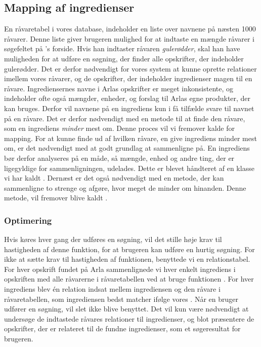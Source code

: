 \subsection{Mapping af ingredienser}
\label{sec:mapping}
En råvaretabel i vores database, indeholder en liste over navnene på næsten 1000 råvarer. Denne liste giver brugeren mulighed for at indtaste en mængde råvarer i søgefeltet på {\Foodl}'s forside. Hvis han indtaster råvaren \textit{gulerødder}, skal han have muligheden for at udføre en søgning, der finder alle opskrifter, der indeholder gulerødder. Det er derfor nødvendigt for vores system at kunne oprette relationer imellem vores råvarer, og de opskrifter, der indeholder ingredienser magen til en råvare. Ingrediensernes navne i Arlas opskrifter er meget inkonsistente, og indeholder ofte også mængder, enheder, og forslag til Arlas egne produkter, der kan bruges. Derfor vil navnene på en ingrediens kun i få tilfælde svare til navnet på en råvare. Det er derfor nødvendigt med en metode til at finde den råvare, som en ingrediens \textit{minder} mest om. Denne proces vil vi fremover kalde for mapping. For at kunne finde ud af hvilken råvare, en give ingrediens minder mest om, er det nødvendigt med at godt grundlag at sammenligne på. En ingrediens bør derfor analyseres på en måde, så mængde, enhed og andre ting, der er ligegyldige for sammenligningen, udelades. Dette er blevet håndteret af en klasse vi har kaldt . Dernæst er det også nødvendigt med en metode, der kan sammenligne to strenge og afgøre, hvor meget de minder om hinanden. Denne metode, vil fremover blive kaldt .

\subsubsection{Optimering}
Hvis  køres hver gang der udføres en søgning, vil det stille høje krav til hastigheden af denne funktion, for at brugeren kan udføre en hurtig søgning. For ikke at sætte krav til hastigheden af funktionen, benyttede vi en relationstabel. For hver opskrift fundet på Arla sammenlignede vi hver enkelt ingrediens i opskriften med alle råvarerne i råvaretabellen ved at bruge funktionen . For hver ingrediens blev én relation indsat mellem ingrediensen og den råvare i råvaretabellen, som ingrediensen bedst matcher ifølge vores . Når en bruger udfører en søgning, vil  slet ikke blive benyttet. Det vil kun være nødvendigt at undersøge de indtastede råvares relationer til ingredienser, og blot præsentere de opskrifter, der er relateret til de fundne ingredienser, som et søgeresultat for brugeren.

